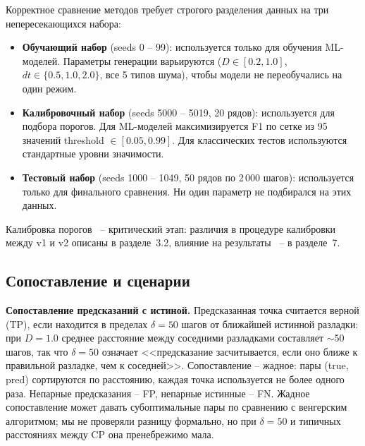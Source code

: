 \documentclass[12pt,a4paper]{article}
\begin{document}
Корректное сравнение методов требует строгого разделения данных на три непересекающихся набора:
\begin{itemize}
    \item \textbf{Обучающий набор} (seeds 0 -- 99): используется только для обучения ML-моделей. Параметры генерации варьируются ($D \in [0.2, 1.0]$, $dt \in \{0.5, 1.0, 2.0\}$, все 5 типов шума), чтобы модели не переобучались на один режим.
    \item \textbf{Калибровочный набор} (seeds 5000 -- 5019, 20 рядов): используется для подбора порогов. Для ML-моделей максимизируется F1 по сетке из 95 значений threshold $\in [0.05, 0.99]$. Для классических тестов используются стандартные уровни значимости.
    \item \textbf{Тестовый набор} (seeds 1000 -- 1049, 50 рядов по 2\,000 шагов): используется только для финального сравнения. Ни один параметр не подбирался на этих данных.
\end{itemize}

Калибровка порогов~ -- критический этап: различия в процедуре калибровки между v1 и v2 описаны в разделе~3.2, влияние на результаты~ -- в разделе~7.

\subsection{Сопоставление и сценарии}

\textbf{Сопоставление предсказаний с истиной.} Предсказанная точка считается верной (TP), если находится в пределах $\delta = 50$ шагов от ближайшей истинной разладки: при $D = 1.0$ среднее расстояние между соседними разладками составляет $\sim$50 шагов, так что $\delta = 50$ означает <<предсказание засчитывается, если оно ближе к правильной разладке, чем к соседней>>. Сопоставление  -- жадное: пары (true, pred) сортируются по расстоянию, каждая точка используется не более одного раза. Непарные предсказания  -- FP, непарные истинные  -- FN. Жадное сопоставление может давать субоптимальные пары по сравнению с венгерским алгоритмом; мы не проверяли разницу формально, но при $\delta = 50$ и типичных расстояниях между CP она пренебрежимо мала.
\end{document}
